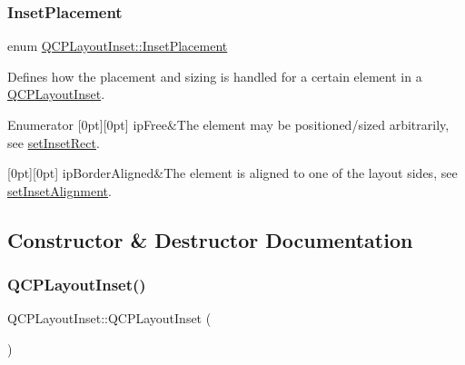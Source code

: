 \subsubsection{\texorpdfstring{Inset\+Placement}{InsetPlacement}}
{\footnotesize\ttfamily enum \hyperlink{classQCPLayoutInset_a8b9e17d9a2768293d2a7d72f5e298192}{Q\+C\+P\+Layout\+Inset\+::\+Inset\+Placement}}

Defines how the placement and sizing is handled for a certain element in a \hyperlink{classQCPLayoutInset}{Q\+C\+P\+Layout\+Inset}. \begin{DoxyEnumFields}{Enumerator}
[0pt][0pt]{}\mbox{\label{classQCPLayoutInset_a8b9e17d9a2768293d2a7d72f5e298192aa4802986ea2cea457f932b115acba59e}} 
ip\+Free&The element may be positioned/sized arbitrarily, see \hyperlink{classQCPLayoutInset_aa487c8378a6f9533567a2e6430099dc3}{set\+Inset\+Rect}. \\
\hline

[0pt][0pt]{}\mbox{\label{classQCPLayoutInset_a8b9e17d9a2768293d2a7d72f5e298192aa81e7df4a785ddee2229a8f47c46e817}} 
ip\+Border\+Aligned&The element is aligned to one of the layout sides, see \hyperlink{classQCPLayoutInset_a62882a4f9ad58bb0f53da12fde022abe}{set\+Inset\+Alignment}. \\
\hline

\end{DoxyEnumFields}


\subsection{Constructor \& Destructor Documentation}
\mbox{\label{classQCPLayoutInset_a3ad984f3221735374cc5dee14356a7dd}} 
\subsubsection{\texorpdfstring{Q\+C\+P\+Layout\+Inset()}{QCPLayoutInset()}}
{\footnotesize\ttfamily Q\+C\+P\+Layout\+Inset\+::\+Q\+C\+P\+Layout\+Inset (\begin{DoxyParamCaption}{ }\end{DoxyParamCaption})\hspace{0.3cm}{\ttfamily [explicit]}}

